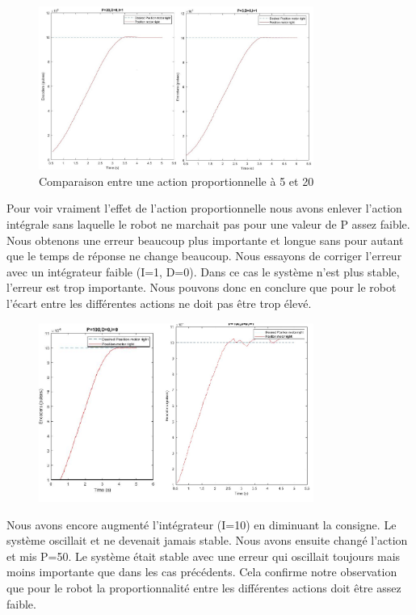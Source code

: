 \documentclass[a4paper]{article}
\begin{document}
		
		\begin{figure}[h]
			\centering
			\includegraphics[width = 9cm]{imgs/fig1.jpg}
			\caption{Comparaison entre une action proportionnelle à 5 et 20}
		\end{figure}
		Pour voir vraiment l’effet de l’action proportionnelle nous avons enlever l’action intégrale sans laquelle le robot ne marchait pas pour une valeur de P assez faible.
		Nous obtenons une erreur beaucoup plus importante et longue sans pour autant que le temps de réponse ne change beaucoup. Nous essayons de corriger l’erreur avec un intégrateur faible (I=1, D=0). Dans ce cas le système n’est plus stable, l’erreur est trop importante. Nous pouvons donc en conclure que pour le robot l’écart entre les différentes actions ne doit pas être trop élevé.
		
		\begin{figure}[h]
			\centering
			\includegraphics[width = 9cm]{imgs/fig2.png}
			\caption{}
		\end{figure}
		Nous avons encore augmenté l’intégrateur (I=10) en diminuant la consigne. Le système oscillait et ne devenait jamais stable. Nous avons ensuite changé l’action et mis P=50. Le système était stable avec une erreur qui oscillait toujours mais moins importante que dans les cas précédents. Cela confirme notre observation que pour le robot la proportionnalité entre les différentes actions doit être assez faible.
		
\end{document}
